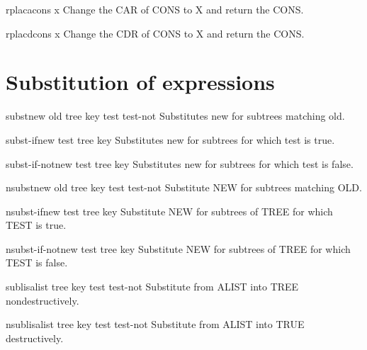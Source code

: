 \documentclass[10pt,english]{book}
\begin{document}
\begin{function}{rplaca}{cons x}
  Change the CAR of CONS to X and return the CONS.
\end{function}

\begin{function}{rplacd}{cons x}
  Change the CDR of CONS to X and return the CONS.
\end{function}

\section{Substitution of expressions}
\label{sec:subst-expr}

\begin{function}{subst}{new old tree \key key test test-not}
  Substitutes new for subtrees matching old.
\end{function}

\begin{function}{subst-if}{new test tree \key key}
  Substitutes new for subtrees for which test is true.
\end{function}

\begin{function}{subst-if-not}{new test tree \key key}
  Substitutes new for subtrees for which test is false.
\end{function}

\begin{function}{nsubst}{new old tree \key key test test-not}
  Substitute NEW for subtrees matching OLD.
\end{function}

\begin{function}{nsubst-if}{new test tree \key key}
  Substitute NEW for subtrees of TREE for which TEST is true.
\end{function}

\begin{function}{nsubst-if-not}{new test tree \key key}
  Substitute NEW for subtrees of TREE for which TEST is false.
\end{function}

\begin{function}{sublis}{alist tree \key key test test-not}
  Substitute from ALIST into TREE nondestructively.
\end{function}

\begin{function}{nsublis}{alist tree \key key test test-not}
  Substitute from ALIST into TRUE destructively.
\end{function}
\end{document}
